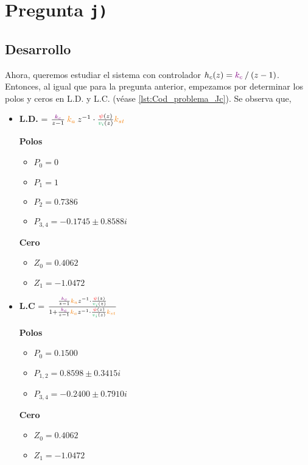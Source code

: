 \section{Pregunta \texttt{j)}}\label{pregunta-j}
\subsection{Desarrollo}

Ahora, queremos estudiar el sistema con controlador $h_{c}(z) = \mathbin{\color{violet}k_{c}} \mathbin{/} (z-1)$.
Entonces, al igual que para la pregunta anterior, empezamos por determinar los
polos y ceros en L.D. y L.C. (véase \autoref{lst:Cod_problema_Jc}). Se observa
que,

\begin{itemize}
  \item \textbf{L.D.} = \( \frac{\mora{k_{c}}}{z-1} \nara{ k_{a}} z^{-1} \cdot \frac{\rojo{\psi}(z)}{\verd{v_i}(z)} \nara{k_{st}} \) 
  
  \begin{multicols}{2}
    \textbf{Polos}
    \begin{itemize}
      \item \(P_{0} = 0 \)
      \item \(P_{1} = 1 \)
      \item \(P_{2} = 0.7386\)
      \item \(P_{3,4} = -0.1745 \pm 0.8588i\) 
    \end{itemize}
    \columnbreak
    \textbf{Cero}
    \begin{itemize}
        \item \(Z_0 = 0.4062\)
        \item \(Z_1 = -1.0472\)
    \end{itemize}
  \end{multicols}
  
  
  \item \textbf{L.C} =  \(\frac{ \frac{\mora{k_{c}}}{z-1} \nara{ k_{a}} z^{-1} \cdot \frac{\rojo{\psi}(z)}{\verd{v_i}(z)}} {1+ \frac{\mora{k_{c}}}{z-1} \nara{ k_{a}} z^{-1} \cdot \frac{\rojo{\psi}(z)}{\verd{v_i}(z)} \nara{k_{st}} }  \)
  
  \begin{multicols}{2}
    \textbf{Polos}
    \begin{itemize}
      \item \(P_{0} = 0.1500 \)
      \item \(P_{1,2} = 0.8598 \pm 0.3415i\)
      \item \(P_{3,4} = -0.2400 \pm 0.7910i\) 
    \end{itemize}
    \columnbreak
    \textbf{Cero}
    \begin{itemize}
        \item \(Z_0 = 0.4062\)
        \item \(Z_1 = -1.0472\)
    \end{itemize}
  \end{multicols}
\end{itemize}

